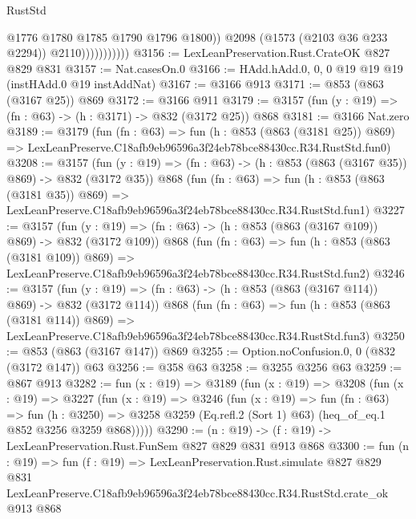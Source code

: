 \begin{lexlean}{RustStd}
\begin{coremodule}
                              @1776
                              @1780
                              @1785
                              @1790
                              @1796
                              @1800))
                          @2098
                          (@1573 (@2103 @36 @233 @2294))
                          @2110)))))))))))
@3156 := LexLeanPreservation.Rust.CrateOK @827 @829 @831
@3157 := Nat.casesOn.{0}
@3166 := HAdd.hAdd.{0, 0, 0} @19 @19 @19 (instHAdd.{0} @19 instAddNat)
@3167 := @3166 @913
@3171 := @853 (@863 (@3167 @25)) @869
@3172 := @3166 @911
@3179 := @3157 (fun (y : @19) => (fn : @63) -> (h : @3171) -> @832 (@3172 @25)) @868
@3181 := @3166 Nat.zero
@3189 := @3179
    (fun (fn : @63) =>
    fun (h : @853 (@863 (@3181 @25)) @869) =>
    LexLeanPreserve.C18afb9eb96596a3f24eb78bce88430cc.R34.RustStd.fun0)
@3208 := @3157
    (fun (y : @19) => (fn : @63) -> (h : @853 (@863 (@3167 @35)) @869) -> @832 (@3172 @35))
    @868
    (fun (fn : @63) =>
    fun (h : @853 (@863 (@3181 @35)) @869) =>
    LexLeanPreserve.C18afb9eb96596a3f24eb78bce88430cc.R34.RustStd.fun1)
@3227 := @3157
    (fun (y : @19) => (fn : @63) -> (h : @853 (@863 (@3167 @109)) @869) -> @832 (@3172 @109))
    @868
    (fun (fn : @63) =>
    fun (h : @853 (@863 (@3181 @109)) @869) =>
    LexLeanPreserve.C18afb9eb96596a3f24eb78bce88430cc.R34.RustStd.fun2)
@3246 := @3157
    (fun (y : @19) => (fn : @63) -> (h : @853 (@863 (@3167 @114)) @869) -> @832 (@3172 @114))
    @868
    (fun (fn : @63) =>
    fun (h : @853 (@863 (@3181 @114)) @869) =>
    LexLeanPreserve.C18afb9eb96596a3f24eb78bce88430cc.R34.RustStd.fun3)
@3250 := @853 (@863 (@3167 @147)) @869
@3255 := Option.noConfusion.{0, 0} (@832 (@3172 @147)) @63
@3256 := @358 @63
@3258 := @3255 @3256 @63
@3259 := @867 @913
@3282 := fun (x : @19) =>
  @3189
    (fun (x : @19) =>
    @3208
      (fun (x : @19) =>
      @3227
        (fun (x : @19) =>
        @3246
          (fun (x : @19) =>
          fun (fn : @63) =>
          fun (h : @3250) =>
          @3258 @3259 (Eq.refl.{2} (Sort 1) @63) (heq_of_eq.{1} @852 @3256 @3259 @868)))))
@3290 := (n : @19) -> (f : @19) -> LexLeanPreservation.Rust.FunSem @827 @829 @831 @913 @868
@3300 := fun (n : @19) =>
  fun (f : @19) =>
  LexLeanPreservation.Rust.simulate
    @827
    @829
    @831
    LexLeanPreserve.C18afb9eb96596a3f24eb78bce88430cc.R34.RustStd.crate_ok
    @913
    @868
\end{coremodule}
\end{lexlean}
